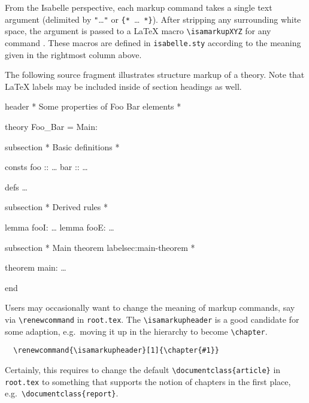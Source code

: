 \begin{isabellebody}
\begin{isamarkuptext}
  \medskip

  From the Isabelle perspective, each markup command takes a single
  text argument (delimited by \verb,",\dots\verb,", or
  \verb,{,\verb,*,~\dots~\verb,*,\verb,},).  After stripping any
  surrounding white space, the argument is passed to a {\LaTeX} macro
  \verb,\isamarkupXYZ, for any command .  These macros
  are defined in \verb,isabelle.sty, according to the meaning given in
  the rightmost column above.

  \medskip The following source fragment illustrates structure markup
  of a theory.  Note that {\LaTeX} labels may be included inside of
  section headings as well.

  \begin{ttbox}
  header {\ttlbrace}* Some properties of Foo Bar elements *{\ttrbrace}

  theory Foo_Bar = Main:

  subsection {\ttlbrace}* Basic definitions *{\ttrbrace}

  consts
    foo :: \dots
    bar :: \dots

  defs \dots

  subsection {\ttlbrace}* Derived rules *{\ttrbrace}

  lemma fooI: \dots
  lemma fooE: \dots

  subsection {\ttlbrace}* Main theorem {\ttback}label{\ttlbrace}sec:main-theorem{\ttrbrace} *{\ttrbrace}

  theorem main: \dots

  end
  \end{ttbox}

  Users may occasionally want to change the meaning of markup
  commands, say via \verb,\renewcommand, in \texttt{root.tex}.  The
  \verb,\isamarkupheader, is a good candidate for some adaption, e.g.\
  moving it up in the hierarchy to become \verb,\chapter,.

\begin{verbatim}
  \renewcommand{\isamarkupheader}[1]{\chapter{#1}}
\end{verbatim}

  \noindent Certainly, this requires to change the default
  \verb,\documentclass{article}, in \texttt{root.tex} to something
  that supports the notion of chapters in the first place, e.g.\
  \verb,\documentclass{report},.


\end{isamarkuptext}
\end{isabellebody}

